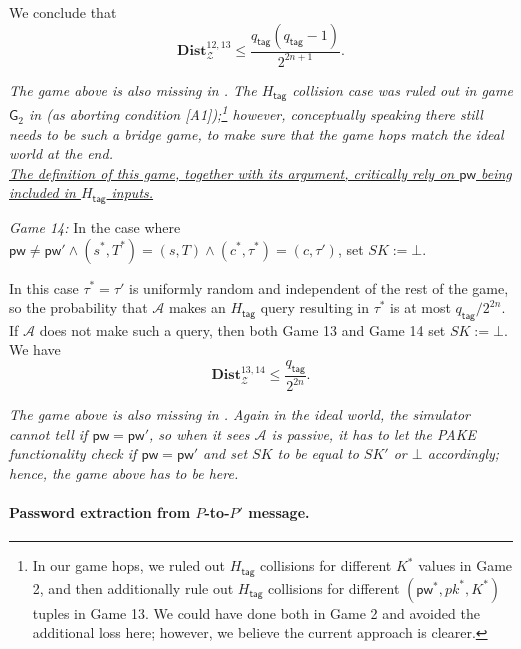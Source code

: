 \documentclass{article}
\theoremstyle{plain}
\theoremstyle{definition}
\theoremstyle{remark}
\newcommand{\adv}{\mathcal{A}}
\newcommand{\env}{\mathcal{Z}}
\newcommand{\Dist}{\mathbf{Dist}}
\newcommand{\Htag}{H_\mathsf{tag}}
\newcommand{\pw}{\mathsf{pw}}
\newcommand{\qtag}{q_\mathsf{tag}}
\begin{document}
We conclude that
\[
\Dist_\env^{12,13} \leq \frac{\qtag(\qtag-1)}{2^{2n+1}}.
\]

\emph{{\color{red}The game above is also missing in \cite{EPRINT:ArrBarJar25}. The $\Htag$ collision case was ruled out in game $\mathsf{G}_2$ in \cite{EPRINT:ArrBarJar25} (as aborting condition [A1]);\footnote{In our game hops, we ruled out $\Htag$ collisions for different $K^*$ values in Game 2, and then additionally rule out $\Htag$ collisions for different $(\pw^*,pk^*,K^*)$ tuples in Game 13. We could have done both in Game 2 and avoided the additional loss here; however, we believe the current approach is clearer.} however, conceptually speaking there still needs to be such a bridge game, to make sure that the game hops match the ideal world at the end. \\
\indent\ul{The definition of this game, together with its argument, critically rely on $\pw$ being included in $\Htag$ inputs.}
}}

\medskip\noindent\emph{Game 14:} In the case where $\pw \neq \pw' \land (s^*,T^*) = (s,T) \land (c^*,\tau^*) = (c,\tau')$, set $SK := \bot$.

In this case $\tau^* = \tau'$ is uniformly random and independent of the rest of the game, so the probability that $\adv$ makes an $\Htag$ query resulting in $\tau^*$ is at most $\qtag/2^{2n}$. If $\adv$ does not make such a query, then both Game 13 and Game 14 set $SK := \bot$. We have
\[
\Dist_\env^{13,14} \leq \frac{\qtag}{2^{2n}}.
\]

\emph{{\color{red}The game above is also missing in \cite{EPRINT:ArrBarJar25}. Again in the ideal world, the simulator cannot tell if $\pw = \pw'$, so when it sees $\adv$ is passive, it has to let the PAKE functionality check if $\pw = \pw'$ and set $SK$ to be equal to $SK'$ or $\bot$ accordingly; hence, the game above has to be here.}}

\paragraph{Password extraction from $P$-to-$P'$ message.}
\mbox{}
\end{document}
